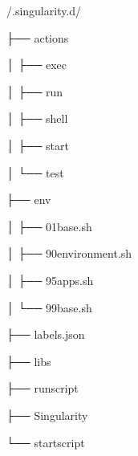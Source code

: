 \documentclass[letterpaper,10pt,english]{sphinxmanual}
\begin{document}
%
\begin{sphinxVerbatim}[commandchars=\\\{\}]
/.singularity.d/


├── actions

│   ├── exec

│   ├── run

│   ├── shell

│   ├── start

│   └── test

├── env

│   ├── 01\PYGZhy{}base.sh

│   ├── 90\PYGZhy{}environment.sh

│   ├── 95\PYGZhy{}apps.sh

│   └── 99\PYGZhy{}base.sh

├── labels.json

├── libs

├── runscript

├── Singularity

└── startscript
\end{sphinxVerbatim}
\end{document}
